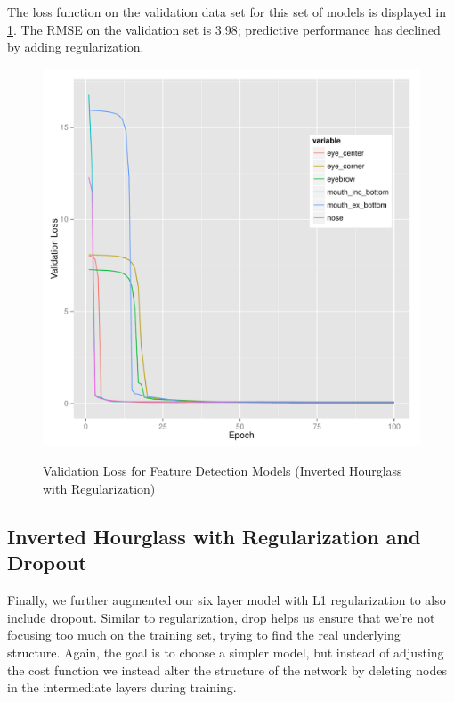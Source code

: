 \documentclass[journal]{IEEEtran}
\begin{document}
The loss function on the validation data set for this set of models is displayed in \cref{fig:val_loss_6_level_inverted_hourglass_reg}. The RMSE on the validation set is 3.98; predictive performance has declined by adding regularization.

\begin{figure}[!htb]
  \centering
  \caption{Validation Loss for Feature Detection Models (Inverted Hourglass with Regularization)}
  \includegraphics[scale=.49]{val_loss_6_level_inverted_hourglass_reg.pdf}
  \label{fig:val_loss_6_level_inverted_hourglass_reg}
\end{figure}

\subsection{Inverted Hourglass with Regularization and Dropout}

Finally, we further augmented our six layer model with L1 regularization to also include dropout. Similar to regularization, drop helps us ensure that we're not focusing too much on the training set, trying to find the real underlying structure.  Again, the goal is to choose a simpler model, but instead of adjusting the cost function we instead alter the structure of the network by deleting nodes in the intermediate layers during training.
\end{document}
